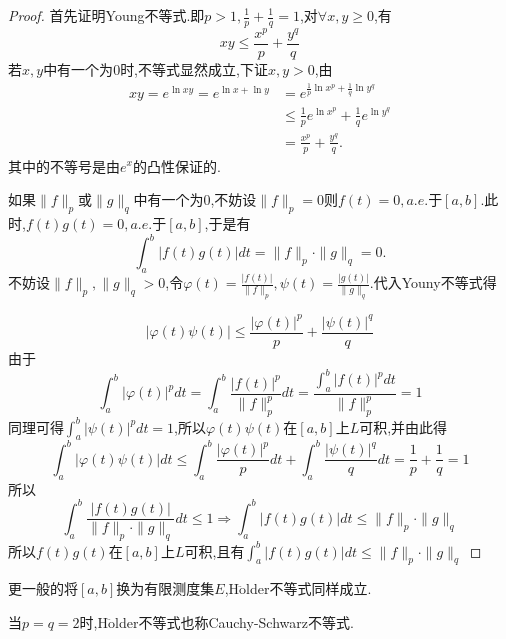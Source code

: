 \documentclass[lang=cn,18pt]{elegantbook}
\begin{document}
\begin{proof}
    首先证明Young不等式.即$p > 1,\frac{1}{p}+\frac{1}{q}=1$,对$\forall x,y \geqslant 0$,有
$$xy\leqslant\frac{x^p}{p}+\frac{y^q}{q}$$
若$x,y$中有一个为$0$时,不等式显然成立,下证$x,y>0$,由 
\begin{align*}
    xy=e^{\ln{xy}}=e^{\ln{x} +\ln{y}} & =  e^{\frac{1}{p}\ln{x^p}+\frac{1}{q}\ln{y^q}}\\
    & \leqslant \frac{1}{p}e^{\ln{x^p}}+\frac{1}{q}e^{\ln{y^q}} \\
    & = \frac{x^p}{p}+\frac{y^q}{q}.
\end{align*}
其中的不等号是由$e^x$的凸性保证的.

如果$\|f\|_p$或$\|g\|_q$中有一个为0,不妨设$\|f\|_p =0$则$f(t)=0,a.e.$于$[a,b]$.此时,$f(t)g(t)=0,a.e.$于$[a,b]$,于是有
$$\int_{a}^{b}|f(t)g(t)|dt=\|f\|_p\cdot \|g\|_{q}=0.$$
不妨设$\|f\|_{p},\|g\|_{q}>0$,令$\varphi(t)=\frac{|f(t)|}{\|f\|_p},\psi(t)=\frac{|g(t)|}{\|g\|_q}.$代入Youny不等式得

$$|\varphi(t)\psi(t)|\leqslant \frac{|\varphi(t)|^p}{p} + \frac{|\psi(t)|^q}{q}$$
由于
$$\int_{a}^{b}|\varphi(t)|^p dt = \int_{a}^{b}\frac{|f(t)|^p}{\|f\|_{p}^{p}}dt=\frac{\int_{a}^{b}|f(t)|^p dt}{\|f\|_{p}^{p}}=1$$
同理可得$\int_{a}^{b}|\psi(t)|^p dt =1$,所以$\varphi(t)\psi(t)$在$[a,b]$上$L$可积,并由此得
$$\int_{a}^{b}|\varphi(t)\psi(t)|dt \leqslant \int_{a}^{b}\frac{|\varphi(t)|^p}{p}dt+\int_{a}^{b}\frac{|\psi(t)|^q}{q}dt=\frac{1}{p}+\frac{1}{q}=1$$
所以
$$\int_{a}^{b}\frac{|f(t)g(t)|}{\|f\|_p\cdot \|g\|_q } dt \leqslant 1 \Longrightarrow \int_{a}^{b}|f(t)g(t)|dt \leqslant \|f\|_p\cdot \|g\|_q $$
所以$f(t)g(t)$在$[a,b]$上$L$可积,且有$\int_{a}^{b}|f(t)g(t)|dt \leqslant \|f\|_p\cdot \|g\|_q $
\end{proof}
\begin{note}
    更一般的将$[a,b]$换为有限测度集$E$,H$\ddot{\text{o}}$lder不等式同样成立.
    
    当$p=q=2$时,H$\ddot{\text{o}}$lder不等式也称Cauchy-Schwarz不等式.
\end{note}
\end{document}

